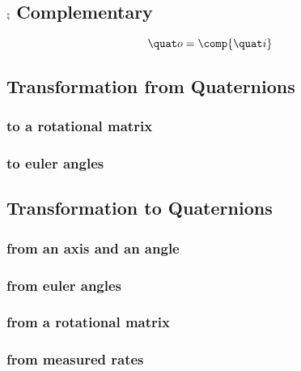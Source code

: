 
\subsection{$\comp{}$ Complementary}
\begin{equation}
\quat o = \comp{\quat i}
\end{equation}



\subsection{Transformation from Quaternions}
\subsubsection*{to a rotational matrix}


\subsubsection*{to euler angles}




\subsection{Transformation to Quaternions}
\subsubsection*{from an axis and an angle}


\subsubsection*{from euler angles}


\subsubsection*{from a rotational matrix}


\subsubsection*{from measured rates}





